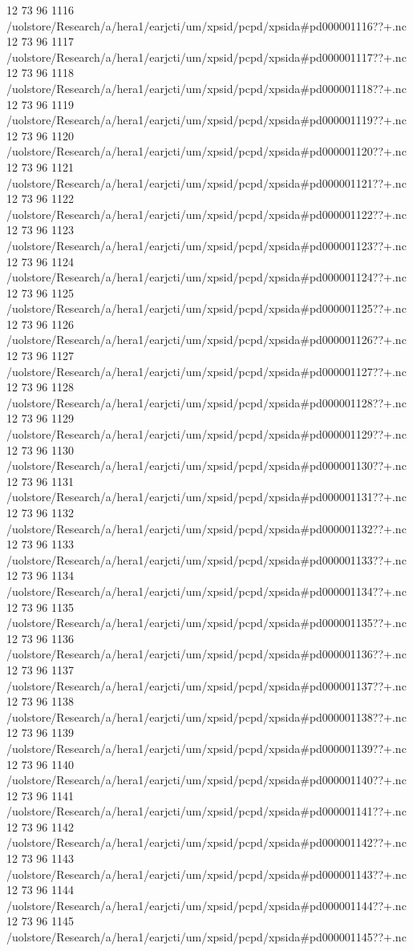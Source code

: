12 73 96
1116
/uolstore/Research/a/hera1/earjcti/um/xpsid/pcpd/xpsida#pd000001116??+.nc
12 73 96
1117
/uolstore/Research/a/hera1/earjcti/um/xpsid/pcpd/xpsida#pd000001117??+.nc
12 73 96
1118
/uolstore/Research/a/hera1/earjcti/um/xpsid/pcpd/xpsida#pd000001118??+.nc
12 73 96
1119
/uolstore/Research/a/hera1/earjcti/um/xpsid/pcpd/xpsida#pd000001119??+.nc
12 73 96
1120
/uolstore/Research/a/hera1/earjcti/um/xpsid/pcpd/xpsida#pd000001120??+.nc
12 73 96
1121
/uolstore/Research/a/hera1/earjcti/um/xpsid/pcpd/xpsida#pd000001121??+.nc
12 73 96
1122
/uolstore/Research/a/hera1/earjcti/um/xpsid/pcpd/xpsida#pd000001122??+.nc
12 73 96
1123
/uolstore/Research/a/hera1/earjcti/um/xpsid/pcpd/xpsida#pd000001123??+.nc
12 73 96
1124
/uolstore/Research/a/hera1/earjcti/um/xpsid/pcpd/xpsida#pd000001124??+.nc
12 73 96
1125
/uolstore/Research/a/hera1/earjcti/um/xpsid/pcpd/xpsida#pd000001125??+.nc
12 73 96
1126
/uolstore/Research/a/hera1/earjcti/um/xpsid/pcpd/xpsida#pd000001126??+.nc
12 73 96
1127
/uolstore/Research/a/hera1/earjcti/um/xpsid/pcpd/xpsida#pd000001127??+.nc
12 73 96
1128
/uolstore/Research/a/hera1/earjcti/um/xpsid/pcpd/xpsida#pd000001128??+.nc
12 73 96
1129
/uolstore/Research/a/hera1/earjcti/um/xpsid/pcpd/xpsida#pd000001129??+.nc
12 73 96
1130
/uolstore/Research/a/hera1/earjcti/um/xpsid/pcpd/xpsida#pd000001130??+.nc
12 73 96
1131
/uolstore/Research/a/hera1/earjcti/um/xpsid/pcpd/xpsida#pd000001131??+.nc
12 73 96
1132
/uolstore/Research/a/hera1/earjcti/um/xpsid/pcpd/xpsida#pd000001132??+.nc
12 73 96
1133
/uolstore/Research/a/hera1/earjcti/um/xpsid/pcpd/xpsida#pd000001133??+.nc
12 73 96
1134
/uolstore/Research/a/hera1/earjcti/um/xpsid/pcpd/xpsida#pd000001134??+.nc
12 73 96
1135
/uolstore/Research/a/hera1/earjcti/um/xpsid/pcpd/xpsida#pd000001135??+.nc
12 73 96
1136
/uolstore/Research/a/hera1/earjcti/um/xpsid/pcpd/xpsida#pd000001136??+.nc
12 73 96
1137
/uolstore/Research/a/hera1/earjcti/um/xpsid/pcpd/xpsida#pd000001137??+.nc
12 73 96
1138
/uolstore/Research/a/hera1/earjcti/um/xpsid/pcpd/xpsida#pd000001138??+.nc
12 73 96
1139
/uolstore/Research/a/hera1/earjcti/um/xpsid/pcpd/xpsida#pd000001139??+.nc
12 73 96
1140
/uolstore/Research/a/hera1/earjcti/um/xpsid/pcpd/xpsida#pd000001140??+.nc
12 73 96
1141
/uolstore/Research/a/hera1/earjcti/um/xpsid/pcpd/xpsida#pd000001141??+.nc
12 73 96
1142
/uolstore/Research/a/hera1/earjcti/um/xpsid/pcpd/xpsida#pd000001142??+.nc
12 73 96
1143
/uolstore/Research/a/hera1/earjcti/um/xpsid/pcpd/xpsida#pd000001143??+.nc
12 73 96
1144
/uolstore/Research/a/hera1/earjcti/um/xpsid/pcpd/xpsida#pd000001144??+.nc
12 73 96
1145
/uolstore/Research/a/hera1/earjcti/um/xpsid/pcpd/xpsida#pd000001145??+.nc
